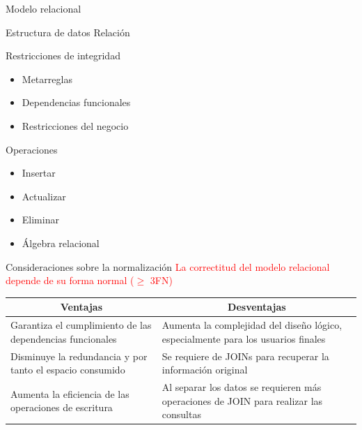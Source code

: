 \begin{frame}{Modelo relacional}
    \begin{overlayarea}{\linewidth}{\textheight}
        \begin{block}{Estructura de datos}
           Relaci\'on
        \end{block}

        \begin{block}{Restricciones de integridad}
            \begin{itemize}
                \item Metarreglas
                \item Dependencias funcionales
                \item Restricciones del negocio
            \end{itemize}
            
        \end{block}

        \begin{block}{Operaciones}
            \begin{itemize}
                \item Insertar
                \item Actualizar
                \item Eliminar
                \item \'Algebra relacional
            \end{itemize}
        \end{block}
    \end{overlayarea}

\end{frame}

\begin{frame}{Consideraciones sobre la normalización}
    \centering
    \large{\textcolor{red}{ La correctitud del modelo relacional depende de su forma normal ($\geq$ 3FN)}}

    \begin{table}[h!]
        \centering
        \begin{tabular}{|p{}|p{}|}
        \hline
        \multicolumn{1}{|c|}{\cellcolor{green1} \textbf{Ventajas}} &  \multicolumn{1}{|c|}{ \cellcolor{red1} \textbf{Desventajas}} \\ \hline
        Garantiza el cumplimiento de las dependencias funcionales & Aumenta la complejidad del diseño lógico, especialmente para los usuarios finales \\ \hline
        Disminuye la redundancia y por tanto el espacio consumido & Se requiere de JOINs para recuperar la información original \\ \hline
        Aumenta la eficiencia de las operaciones de escritura & Al separar los datos se requieren más operaciones de JOIN para realizar las consultas\\ \hline
        \end{tabular}
    \end{table}

\end{frame}


